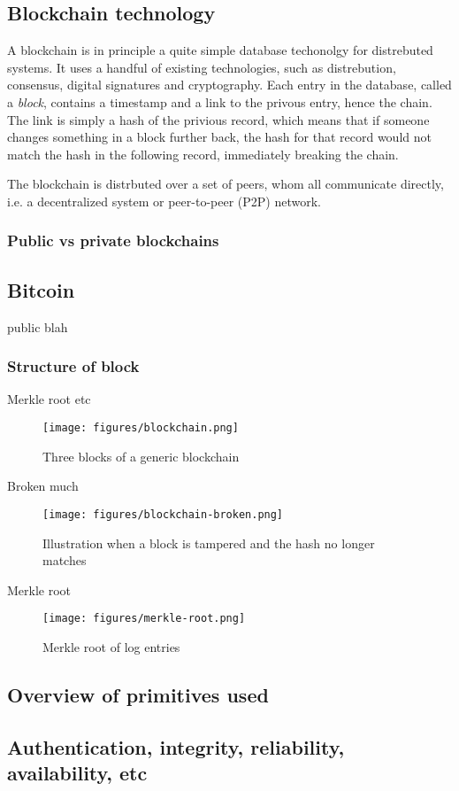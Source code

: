 

\subsection{Blockchain technology}

A blockchain is in principle a quite simple database techonolgy for
distrebuted systems. It uses a handful of existing technologies, such
as distrebution, consensus, digital signatures and cryptography.  Each
entry in the database, called a \textit{block}, contains a timestamp
and a link to the privous entry, hence the chain. The link is simply a
hash of the privious record, which means that if someone changes
something in a block further back, the hash for that record would not
match the hash in the following record, immediately breaking the
chain.

The blockchain is distrbuted over a set of peers, whom all communicate
directly, i.e. a decentralized system or peer-to-peer (P2P) network.


\subsubsection{Public vs private blockchains}

\subsection{Bitcoin}
public blah

\subsubsection{Structure of block}
Merkle root etc

\begin{figure}[ht]
  \centering
  \texttt{[image: figures/blockchain.png]}
  \caption{\label{fig:blockchain} Three blocks of a generic blockchain}
\end{figure}

Broken much

\begin{figure}[ht]
  \centering
  \texttt{[image: figures/blockchain-broken.png]}
  \caption{\label{fig:blockchain-broken} Illustration when a block is
    tampered and the hash no longer matches}
\end{figure}

Merkle root

\begin{figure}[ht]
  \centering
  \texttt{[image: figures/merkle-root.png]}
  \caption{\label{fig:merkle-root} Merkle root of log entries}
\end{figure}

\subsection{Overview of primitives used}

\subsection{Authentication, integrity, reliability, availability, etc}
